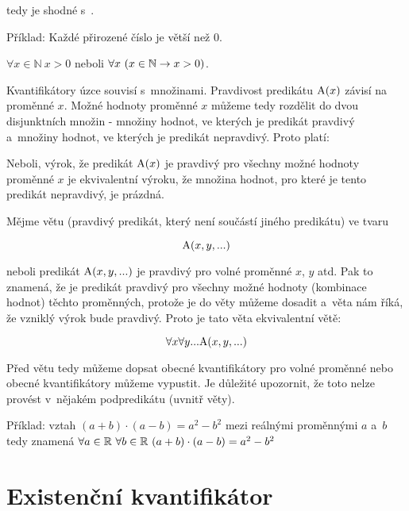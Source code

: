 tedy  je shodné s~.

Příklad: Každé přirozené číslo je větší než 0. 

\(\forall x \in \mathbb{N} \ x > 0\) neboli \(\forall x \ (x \in \mathbb{N} \rightarrow x > 0)\).

Kvantifikátory úzce souvisí s~množinami. Pravdivost predikátu \(\mathrm{A}(x)\) závisí na proměnné \(x\). Možné hodnoty
proměnné \(x\) můžeme tedy rozdělit do dvou disjunktních množin - množiny hodnot, ve kterých je predikát pravdivý a~množiny hodnot, ve kterých je predikát nepravdivý. Proto platí:


Neboli, výrok, že predikát \(\mathrm{A}(x)\) je pravdivý pro všechny možné hodnoty proměnné \(x\) je ekvivalentní výroku, že množina hodnot, pro které je tento predikát nepravdivý, je prázdná.

Mějme větu (pravdivý predikát, který není součástí jiného predikátu) ve tvaru

\begin{equation}
\mathrm{A}(x, y, ...)
\end{equation}

neboli predikát \(\mathrm{A}(x, y, ...)\) je pravdivý pro volné proměnné \(x\), \(y\) atd. Pak to znamená,
že je predikát pravdivý pro všechny možné hodnoty (kombinace hodnot) těchto proměnných, protože je do věty můžeme dosadit a~věta nám říká, že vzniklý výrok bude pravdivý. Proto je tato věta ekvivalentní větě:

\begin{equation}
\forall x \forall y ... \mathrm{A}(x, y, ...)
\end{equation}

Před větu tedy můžeme dopsat obecné kvantifikátory pro volné proměnné nebo  obecné kvantifikátory můžeme vypustit. Je důležité upozornit, že toto nelze provést v~nějakém podpredikátu (uvnitř věty).

Příklad: vztah \((a + b) \cdot (a - b) = a^2 - b^2\) mezi reálnými proměnnými \(a\) a~\(b\) tedy znamená \(\forall a \in \mathbb{R} \ \forall b \in \mathbb{R} \ (a + b) \cdot (a - b) = a^2 - b^2\)

\section{Existenční kvantifikátor}

